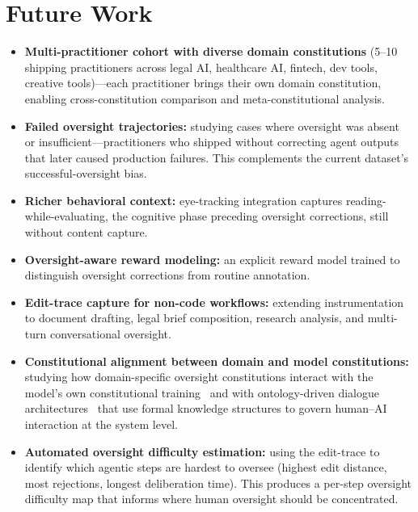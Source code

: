 \documentclass[11pt]{article}
\begin{document}
\section{Future Work}
\label{sec:future-work}

\begin{itemize}[leftmargin=1.5em]

\item \textbf{Multi-practitioner cohort with diverse domain constitutions} (5--10 shipping practitioners across legal AI, healthcare AI, fintech, dev tools, creative tools)---each practitioner brings their own domain constitution, enabling cross-constitution comparison and meta-constitutional analysis.

\item \textbf{Failed oversight trajectories:} studying cases where oversight was absent or insufficient---practitioners who shipped without correcting agent outputs that later caused production failures.
This complements the current dataset's successful-oversight bias.

\item \textbf{Richer behavioral context:} eye-tracking integration captures reading-while-evaluating, the cognitive phase preceding oversight corrections, still without content capture.

\item \textbf{Oversight-aware reward modeling:} an explicit reward model trained to distinguish oversight corrections from routine annotation.

\item \textbf{Edit-trace capture for non-code workflows:} extending instrumentation to document drafting, legal brief composition, research analysis, and multi-turn conversational oversight.

\item \textbf{Constitutional alignment between domain and model constitutions:} studying how domain-specific oversight constitutions interact with the model's own constitutional training~\citep{bai2022constitutional} and with ontology-driven dialogue architectures~\citep{palagin2023dialogue} that use formal knowledge structures to govern human--AI interaction at the system level.

\item \textbf{Automated oversight difficulty estimation:} using the edit-trace to identify which agentic steps are hardest to oversee (highest edit distance, most rejections, longest deliberation time).
This produces a per-step oversight difficulty map that informs where human oversight should be concentrated.

\end{itemize}
\end{document}
